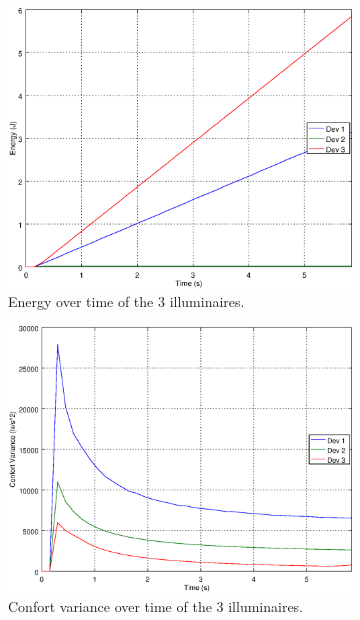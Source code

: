 \begin{figure}[ht]
    \centering
    \begin{subfigure}[t]{0.3\textwidth}
    \centering
    \includegraphics[width=.95\textwidth]{img/e_open_o101}
    \caption{Energy over time of the 3 illuminaires.}
    \label{fig:e_open_o101}
    \end{subfigure}
    \begin{subfigure}[t]{0.3\textwidth}
    \centering
    \includegraphics[width=.95\textwidth]{img/f_open_o101}
    \caption{Confort variance over time of the 3 illuminaires.}
    \label{fig:f_open_o101}
    \end{subfigure}
    \begin{subfigure}[t]{0.3\textwidth}

\end{subfigure}
\end{figure}

